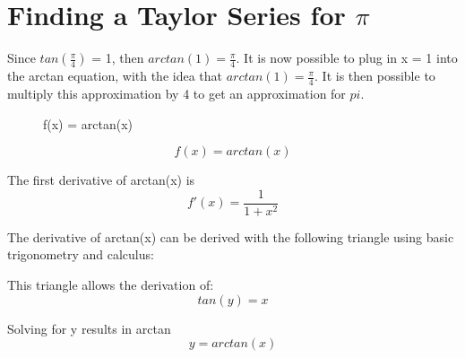 \documentclass[12pt, titlepage]{article}
\begin{document}
\section{Finding a Taylor Series for \(\pi\)}
Since \(tan(\frac{\pi}{4})\) = 1, then \(arctan(1)= \frac{\pi}{4}\). It is now possible to plug in x = 1 into the arctan equation, with the idea that \(arctan(1) = \frac{\pi}{4}\). It is then possible to multiply this approximation by 4 to get an approximation for \(pi\).

\begin{figure}[H]
\centering
    \caption[]{f(x) = arctan(x)}
\end{figure}

\begin{equation*}
  f(x) = arctan(x)
\end{equation*}

The first derivative of arctan(x) is 
\begin{equation*}
f'(x) = \frac{1}{1 + x^{2}}
\end{equation*}

\pagebreak
The derivative of arctan(x) can be derived with the following triangle using basic trigonometry and calculus:
\begin{figure}[H]
\centering
{}
\end{figure}

This triangle allows the derivation of:
\begin{equation*}
 tan(y) = x
\end{equation*}

Solving for y results in arctan
\begin{equation*}
  y = arctan(x)
\end{equation*}
\end{document}
